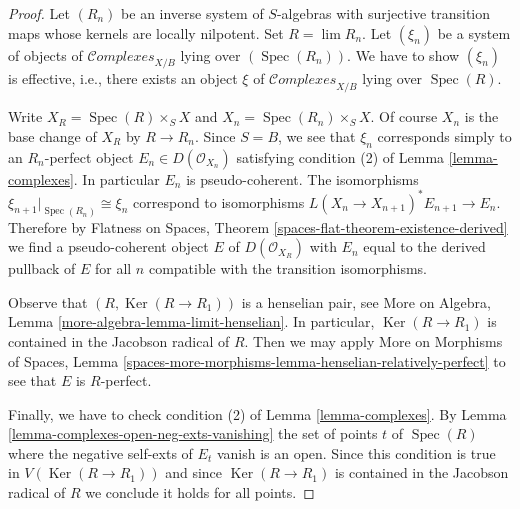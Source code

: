 \documentclass{stacks-project}
\theoremstyle{plain}
\theoremstyle{definition}
\theoremstyle{remark}
\numberwithin{equation}{subsection}
\def\lim{\mathop{\mathrm{lim}}\nolimits}
\def\Spec{\mathop{\mathrm{Spec}}}
\def\Ker{\mathop{\mathrm{Ker}}}
\def\Complexesstack{\mathcal{C}\!\mathit{omplexes}}
\begin{document}
\begin{proof}
Let $(R_n)$ be an inverse system of $S$-algebras with surjective transition
maps whose kernels are locally nilpotent. Set $R = \lim R_n$.
Let $(\xi_n)$ be a system of objects of $\Complexesstack_{X/B}$
lying over $(\Spec(R_n))$. We have to show $(\xi_n)$ is effective, i.e.,
there exists an object $\xi$ of $\Complexesstack_{X/B}$ lying over
$\Spec(R)$.

\medskip\noindent
Write $X_R = \Spec(R) \times_S X$ and $X_n = \Spec(R_n) \times_S X$.
Of course $X_n$ is the base change of $X_R$ by $R \to R_n$. Since $S = B$,
we see that $\xi_n$ corresponds simply to an $R_n$-perfect object
$E_n \in D(\mathcal{O}_{X_n})$ satisfying condition (2) of
Lemma \ref{lemma-complexes}. In particular $E_n$ is pseudo-coherent.
The isomorphisms $\xi_{n + 1}|_{\Spec(R_n)} \cong \xi_n$
correspond to isomorphisms $L(X_n \to X_{n + 1})^*E_{n + 1} \to E_n$.
Therefore by
Flatness on Spaces, Theorem \ref{spaces-flat-theorem-existence-derived}
we find a pseudo-coherent object $E$ of $D(\mathcal{O}_{X_R})$
with $E_n$ equal to the derived pullback of $E$ for all $n$
compatible with the transition isomorphisms.

\medskip\noindent
Observe that $(R, \Ker(R \to R_1))$ is a henselian pair, see
More on Algebra, Lemma \ref{more-algebra-lemma-limit-henselian}.
In particular, $\Ker(R \to R_1)$ is contained in the Jacobson radical of $R$.
Then we may apply More on Morphisms of Spaces, Lemma
\ref{spaces-more-morphisms-lemma-henselian-relatively-perfect}
to see that $E$ is $R$-perfect.

\medskip\noindent
Finally, we have to check condition (2) of Lemma \ref{lemma-complexes}.
By Lemma \ref{lemma-complexes-open-neg-exts-vanishing}
the set of points $t$ of $\Spec(R)$ where the negative self-exts of $E_t$
vanish is an open. Since this condition is true in $V(\Ker(R \to R_1))$
and since $\Ker(R \to R_1)$ is contained in the Jacobson radical of $R$
we conclude it holds for all points.
\end{proof}
\end{document}
